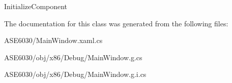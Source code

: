 Initialize\+Component 



The documentation for this class was generated from the following files\+:\begin{DoxyCompactItemize}
\item 
A\+S\+E6030/Main\+Window.\+xaml.\+cs\item 
A\+S\+E6030/obj/x86/\+Debug/Main\+Window.\+g.\+cs\item 
A\+S\+E6030/obj/x86/\+Debug/Main\+Window.\+g.\+i.\+cs\end{DoxyCompactItemize}
